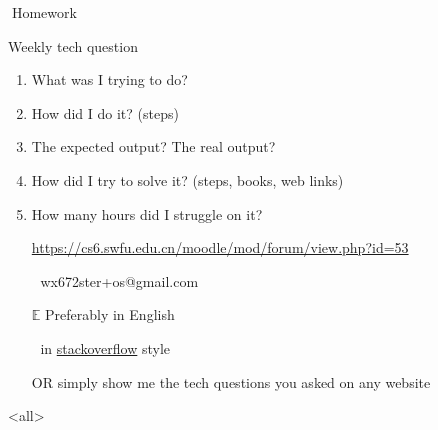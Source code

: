\begin{frame}{{}Homework}
  \begin{block}{Weekly tech question}
    \begin{enumerate}
    \item What was I trying to do?
    \item How did I do it? (steps)
    \item The expected output? The real output?
    \item How did I try to solve it? (steps, books, web links)
    \item How many hours did I struggle on it?
    \end{enumerate}
  \end{block}
  \begin{itemize}
  \item[\moodle] \url{https://cs6.swfu.edu.cn/moodle/mod/forum/view.php?id=53}
  \item[📧] \alert{\ttfamily wx672ster+os@gmail.com}%
  \item[$\mathbb{E}$] Preferably in English
  \item[] in
    \href{https://stackoverflow.com/questions/39199299/what-is-the-essential-difference-between-compound-command-and-normal-command-inlink}{stackoverflow}
    style
  \item[OR] simply show me the tech questions you asked on any website
  \end{itemize}  
\end{frame}

\mode<all>
